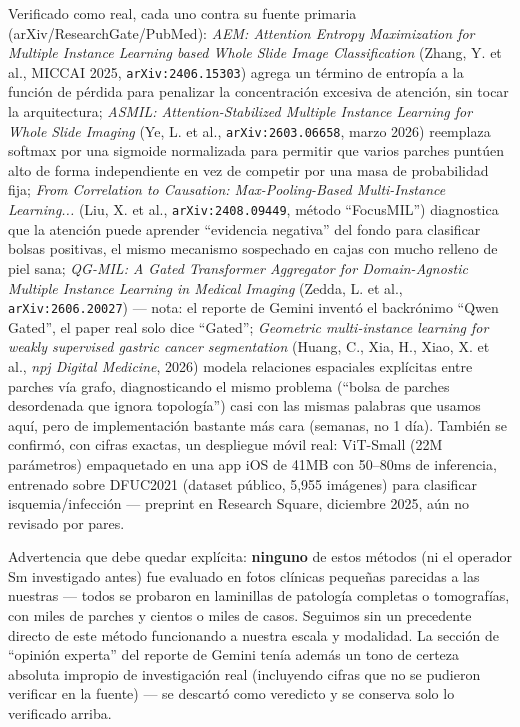 \documentclass[12pt,letterpaper]{report}
\begin{document}
Verificado como real, cada uno contra su fuente primaria (arXiv/ResearchGate/PubMed): \emph{AEM:
Attention Entropy Maximization for Multiple Instance Learning based Whole Slide Image Classification}
(Zhang, Y. et al., MICCAI 2025, \texttt{arXiv:2406.15303}) agrega un término de entropía a la función
de pérdida para penalizar la concentración excesiva de atención, sin tocar la arquitectura;
\emph{ASMIL: Attention-Stabilized Multiple Instance Learning for Whole Slide Imaging} (Ye, L. et al.,
\texttt{arXiv:2603.06658}, marzo 2026) reemplaza softmax por una sigmoide normalizada para permitir
que varios parches puntúen alto de forma independiente en vez de competir por una masa de probabilidad
fija; \emph{From Correlation to Causation: Max-Pooling-Based Multi-Instance Learning...} (Liu, X. et
al., \texttt{arXiv:2408.09449}, método ``FocusMIL'') diagnostica que la atención puede aprender
``evidencia negativa'' del fondo para clasificar bolsas positivas, el mismo mecanismo sospechado en
cajas con mucho relleno de piel sana; \emph{QG-MIL: A Gated Transformer Aggregator for
Domain-Agnostic Multiple Instance Learning in Medical Imaging} (Zedda, L. et al.,
\texttt{arXiv:2606.20027}) --- nota: el reporte de Gemini inventó el backrónimo ``Qwen Gated'', el
paper real solo dice ``Gated''; \emph{Geometric multi-instance learning for weakly supervised gastric
cancer segmentation} (Huang, C., Xia, H., Xiao, X. et al., \emph{npj Digital Medicine}, 2026) modela
relaciones espaciales explícitas entre parches vía grafo, diagnosticando el mismo problema
(``bolsa de parches desordenada que ignora topología'') casi con las mismas palabras que usamos aquí,
pero de implementación bastante más cara (semanas, no 1 día). También se confirmó, con cifras exactas,
un despliegue móvil real: ViT-Small (22M parámetros) empaquetado en una app iOS de 41MB con 50--80ms
de inferencia, entrenado sobre DFUC2021 (dataset público, 5{,}955 imágenes) para clasificar
isquemia/infección --- preprint en Research Square, diciembre 2025, aún no revisado por pares.

Advertencia que debe quedar explícita: \textbf{ninguno} de estos métodos (ni el operador Sm
investigado antes) fue evaluado en fotos clínicas pequeñas parecidas a las nuestras --- todos se
probaron en laminillas de patología completas o tomografías, con miles de parches y cientos o miles
de casos. Seguimos sin un precedente directo de este método funcionando a nuestra escala y modalidad.
La sección de ``opinión experta'' del reporte de Gemini tenía además un tono de certeza absoluta
impropio de investigación real (incluyendo cifras que no se pudieron verificar en la fuente) --- se
descartó como veredicto y se conserva solo lo verificado arriba.
\end{document}
